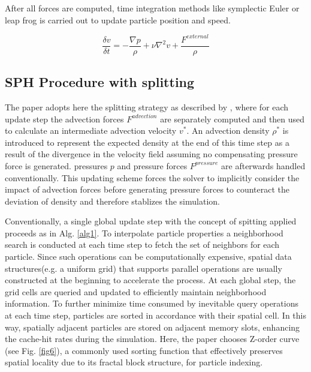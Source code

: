 \documentclass[
	11pt, 
	DIV10,
	ngerman,
	a4paper, 
	oneside, 
	headings=normal, 
	captions=tableheading,
	final, 
	numbers=noenddot
]{scrartcl}
\begin{document}
After all forces are computed, time integration methods like symplectic Euler or leap frog is carried out to update particle position and speed.

\begin{equation}
	\label{eq1}
	\frac{\delta v}{\delta t} = -\frac{\nabla p}{\rho} + \nu \nabla^{2} v + \frac{F^{external}}{\rho}
\end{equation}

\subsection{SPH Procedure with splitting}

The paper adopts here the splitting strategy as described by \cite{ihmsen2014sph}, where for each update step the advection forces $ F^{advection} $ are separately computed and then used to calculate an intermediate advection velocity $ v^{*} $. An advection density $ \rho^{*} $ is introduced to represent the expected density at the end of this time step as a result of the divergence in the velocity field assuming no compensating pressure force is generated. pressures $ p $ and pressure forces $ F^{pressure} $ are afterwards handled conventionally. This updating scheme forces the solver to implicitly consider the impact of advection forces before generating pressure forces to counteract the deviation of density and therefore stablizes the simulation.
\par
Conventionally, a single global update step with the concept of spitting applied proceeds as in Alg. \ref{alg1}. To interpolate particle properties a neighborhood search is conducted at each time step to fetch the set of neighbors for each particle. Since such operations can be computationally expensive, spatial data
structures(e.g. a uniform grid) that supports parallel operations are usually constructed at the beginning to accelerate the process. At each global step, the grid cells are queried and updated to efficiently maintain neighborhood information. To further minimize time consumed by inevitable query operations at each time step, particles are sorted in accordance with their spatial cell. In this way, spatially adjacent particles are stored on adjacent memory slots, enhancing the cache-hit rates during the simulation. Here, the paper chooses Z-order curve (see Fig. \ref{fig6}), a commonly used sorting function that effectively preserves spatial locality due to its fractal block structure, for particle indexing.
\end{document}
